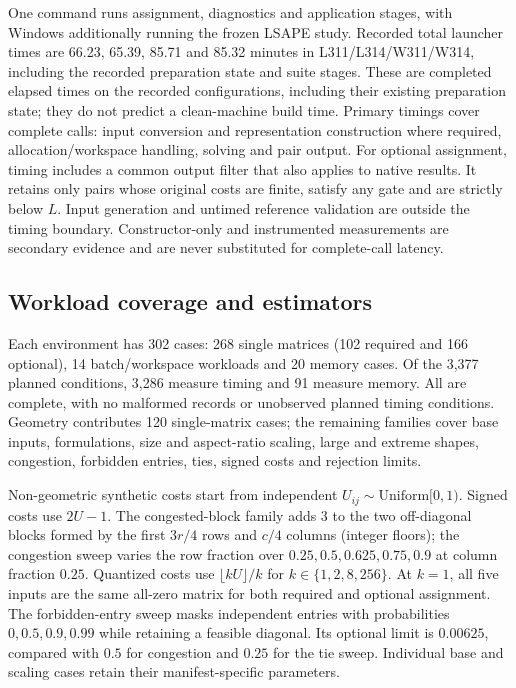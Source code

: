 \documentclass[11pt,a4paper]{article}
\begin{document}
One command runs assignment, diagnostics and application stages, with Windows additionally running the frozen LSAPE study. Recorded total launcher times are 66.23, 65.39, 85.71 and 85.32 minutes in L311/L314/W311/W314, including the recorded preparation state and suite stages. These are completed elapsed times on the recorded configurations, including their existing preparation state; they do not predict a clean-machine build time. Primary timings cover complete calls: input conversion and representation construction where required, allocation/workspace handling, solving and pair output. For optional assignment, timing includes a common output filter that also applies to native results. It retains only pairs whose original costs are finite, satisfy any gate and are strictly below $L$. Input generation and untimed reference validation are outside the timing boundary. Constructor-only and instrumented measurements are secondary evidence and are never substituted for complete-call latency.

\begin{table}[!htbp]
\centering
\caption{Protocol and evidence inventory for the four October environments. Repeated rounds are within-session observations; timing and memory conditions have different contracts. The November microscopy session is separate.}
\label{tab:protocol}
\begingroup\small
\setlength{\tabcolsep}{3pt}
\renewcommand{\arraystretch}{1.12}

\endgroup
\end{table}

\subsection{Workload coverage and estimators}

Each environment has 302 cases: 268 single matrices (102 required and 166 optional), 14 batch/workspace workloads and 20 memory cases. Of the 3,377 planned conditions, 3,286 measure timing and 91 measure memory. All are complete, with no malformed records or unobserved planned timing conditions. Geometry contributes 120 single-matrix cases; the remaining families cover base inputs, formulations, size and aspect-ratio scaling, large and extreme shapes, congestion, forbidden entries, ties, signed costs and rejection limits.

Non-geometric synthetic costs start from independent $U_{ij}\sim\mathrm{Uniform}[0,1)$. Signed costs use $2U-1$. The congested-block family adds 3 to the two off-diagonal blocks formed by the first $3r/4$ rows and $c/4$ columns (integer floors); the congestion sweep varies the row fraction over $0.25,0.5,0.625,0.75,0.9$ at column fraction $0.25$. Quantized costs use $\lfloor kU\rfloor/k$ for $k\in\{1,2,8,256\}$. At $k=1$, all five inputs are the same all-zero matrix for both required and optional assignment. The forbidden-entry sweep masks independent entries with probabilities $0,0.5,0.9,0.99$ while retaining a feasible diagonal. Its optional limit is $0.00625$, compared with $0.5$ for congestion and $0.25$ for the tie sweep. Individual base and scaling cases retain their manifest-specific parameters.
\end{document}
